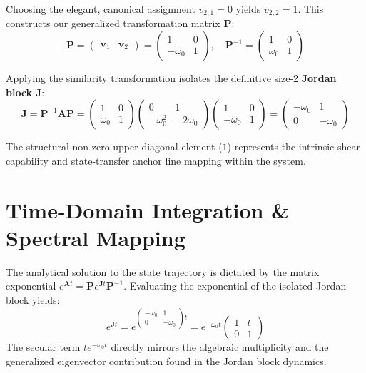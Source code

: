 \documentclass[11pt,preview]{article}
\begin{document}
Choosing the elegant, canonical assignment $v_{2,1} = 0$ yields $v_{2,2} = 1$. This constructs our generalized transformation matrix $\mathbf{P}$:
\begin{equation}
    \mathbf{P} = \begin{pmatrix} \mathbf{v}_1 & \mathbf{v}_2 \end{pmatrix} = \begin{pmatrix} 1 & 0 \\ -\omega_0 & 1 \end{pmatrix}, \quad \mathbf{P}^{-1} = \begin{pmatrix} 1 & 0 \\ \omega_0 & 1 \end{pmatrix}
\end{equation}

Applying the similarity transformation isolates the definitive size-2 \textbf{Jordan block} $\mathbf{J}$:
\begin{equation}
    \mathbf{J} = \mathbf{P}^{-1}\mathbf{A}\mathbf{P} = \begin{pmatrix} 1 & 0 \\ \omega_0 & 1 \end{pmatrix} \begin{pmatrix} 0 & 1 \\ -\omega_0^2 & -2\omega_0 \end{pmatrix} \begin{pmatrix} 1 & 0 \\ -\omega_0 & 1 \end{pmatrix} = \begin{pmatrix} -\omega_0 & 1 \\ 0 & -\omega_0 \end{pmatrix}
\end{equation}

The structural non-zero upper-diagonal element ($1$) represents the intrinsic shear capability and state-transfer anchor line mapping within the system.

\section{Time-Domain Integration \& Spectral Mapping}
The analytical solution to the state trajectory is dictated by the matrix exponential $e^{\mathbf{A}t} = \mathbf{P} e^{\mathbf{J}t} \mathbf{P}^{-1}$. Evaluating the exponential of the isolated Jordan block yields:
\begin{equation}
    e^{\mathbf{J}t} = e^{\begin{pmatrix} -\omega_0 & 1 \\ 0 & -\omega_0 \end{pmatrix}t} = e^{-\omega_0 t} \begin{pmatrix} 1 & t \\ 0 & 1 \end{pmatrix}
\end{equation}
The secular term $t e^{-\omega_0 t}$ directly mirrors the algebraic multiplicity and the generalized eigenvector contribution found in the Jordan block dynamics. 
\end{document}
